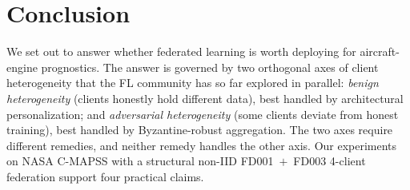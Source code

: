 \documentclass[preprint,12pt,authoryear]{elsarticle}
\begin{document}
\section{Conclusion}
\label{sec:conclusion}

We set out to answer whether federated learning is worth deploying
for aircraft-engine prognostics. The answer is governed by two
orthogonal axes of client heterogeneity that the FL community has
so far explored in parallel: \emph{benign heterogeneity} (clients
honestly hold different data), best handled by architectural
personalization; and \emph{adversarial heterogeneity} (some clients
deviate from honest training), best handled by Byzantine-robust
aggregation. The two axes require different remedies, and neither
remedy handles the other axis. Our experiments on NASA C-MAPSS
with a structural non-IID FD001~$+$~FD003 4-client federation
support four practical claims.
\end{document}
